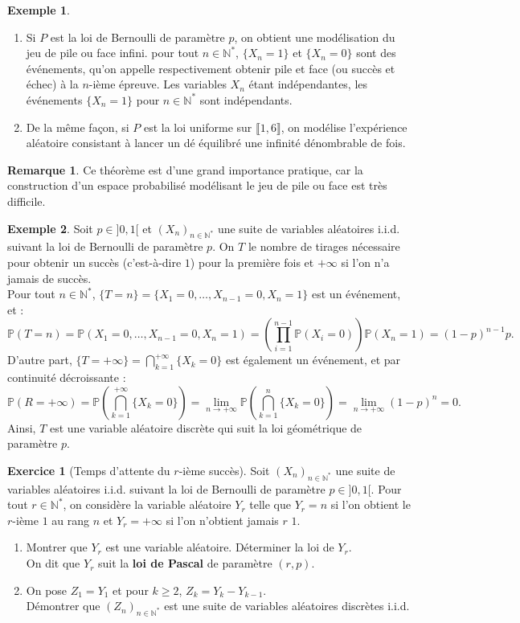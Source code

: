 \documentclass[french]{article}
\renewcommand{\P}{\mathbb{P}}
\newcommand{\N}{\mathbb{N}}
\newcommand{\st}{^*}
\theoremstyle{plain}
\theoremstyle{definition}
\newtheorem*{ex}{Exemple}
\newtheorem{exo}{Exercice}
\newtheorem*{rmq}{Remarque}
\theoremstyle{remark}
\begin{document}
\begin{ex}
	\begin{enumerate}
		\item Si $P$ est la loi de Bernoulli de paramètre $p$, on obtient une modélisation du jeu de pile ou face infini. pour tout $n\in\N\st$, $\{X_n=1\}$ et $\{X_n=0\}$ sont des événements, qu'on appelle respectivement obtenir pile et face (ou succès et échec) à la $n$-ième épreuve. Les variables $X_n$ étant indépendantes, les événements $\{X_n=1\}$ pour $n\in\N\st$ sont indépendants.
		\item De la même façon, si $P$ est la loi uniforme sur $\llbracket1,6\rrbracket$, on modélise l'expérience aléatoire consistant à lancer un dé équilibré une infinité dénombrable de fois.
	\end{enumerate}
\end{ex}

\begin{rmq}
	Ce théorème est d'une grand importance pratique, car la construction d'un espace probabilisé modélisant le jeu de pile ou face est très difficile.
\end{rmq}

\begin{ex}
	Soit $p\in]0,1[$ et $(X_n)_{n\in\N\st}$ une suite de variables aléatoires i.i.d. suivant la loi de Bernoulli de paramètre $p$. On $T$ le nombre de tirages nécessaire pour obtenir un succès (c'est-à-dire $1$) pour la première fois et $+\infty$ si l'on n'a jamais de succès.\\
	Pour tout $n\in\N\st$, $\{T=n\}=\{X_1=0,\ldots,X_{n-1}=0,X_n=1\}$ est un événement, et :
	$$\P(T=n)=\P(X_1=0,\ldots,X_{n-1}=0,X_n=1)=\left(\prod_{i=1}^{n-1}\P(X_i=0)\right)\P(X_n=1)=(1-p)^{n-1}p.$$ D'autre part, $\{T=+\infty\}=\displaystyle\bigcap_{k=1}^{+\infty}\{X_k=0\}$ est également un événement, et par continuité décroissante :
	$$\P(R=+\infty)=\P\left(\bigcap_{k=1}^{+\infty}\{X_k=0\}\right)=\underset{n\to+\infty}{\lim}\P\left(\bigcap_{k=1}^n\{X_k=0\}\right)=\underset{n\to+\infty}{\lim}(1-p)^n=0.$$
	Ainsi, $T$ est une variable aléatoire discrète qui suit la loi géométrique de paramètre $p$.
\end{ex}

\begin{exo}[Temps d'attente du $r$-ième succès]
	Soit $(X_n)_{n\in\N\st}$ une suite de variables aléatoires i.i.d. suivant la loi de Bernoulli de paramètre $p\in]0,1[$. Pour tout $r\in\N\st$, on considère la variable aléatoire $Y_r$ telle que $Y_r=n$ si l'on obtient le $r$-ième $1$ au rang $n$ et $Y_r=+\infty$ si l'on n'obtient jamais $r$ $1$.
	\begin{enumerate}
		\item Montrer que $Y_r$ est une variable aléatoire. Déterminer la loi de $Y_r$.\\
		On dit que $Y_r$ suit la \textbf{loi de Pascal} de paramètre $(r,p)$.
		\item On pose $Z_1=Y_1$ et pour $k\geqslant2$, $Z_k=Y_k-Y_{k-1}$. \\
		Démontrer que $(Z_n)_{n\in\N\st}$ est une suite de variables aléatoires discrètes i.i.d.
	\end{enumerate}
\end{exo}
\end{document}
